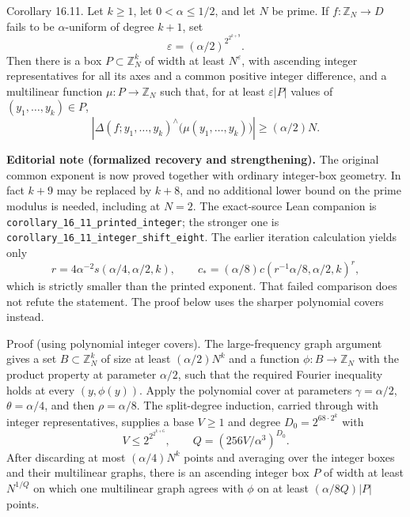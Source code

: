 \documentclass[10pt]{article}
\begin{document}
Corollary 16.11. Let $k\geqslant1$, let $0<\alpha\leqslant1/2$, and let $N$ be prime. If $f: \mathbb{Z}_{N} \rightarrow D$ fails to be $\alpha$-uniform of degree $k+1$, set
\[
\varepsilon=(\alpha/2)^{2^{2^{k+9}}}.
\]
Then there is a box $P\subset\mathbb{Z}_{N}^{k}$ of width at least $N^{\varepsilon}$, with ascending integer representatives for all its axes and a common positive integer difference, and a multilinear function $\mu:P\rightarrow\mathbb{Z}_{N}$ such that, for at least $\varepsilon|P|$ values of $(y_1,\ldots,y_k)\in P$,
\[
\left|\Delta(f;y_1,\ldots,y_k)^{\wedge}\bigl(\mu(y_1,\ldots,y_k)\bigr)\right|
\geqslant (\alpha/2)N.
\]

\noindent\textbf{Editorial note (formalized recovery and strengthening).}
The original common exponent is now proved together with ordinary integer-box geometry. In fact $k+9$ may be replaced by $k+8$, and no additional lower bound on the prime modulus is needed, including at $N=2$. The exact-source Lean companion is \texttt{corollary\_16\_11\_printed\_integer}; the stronger one is \texttt{corollary\_16\_11\_integer\_shift\_eight}. The earlier iteration calculation yields only
\[
r=4\alpha^{-2}s(\alpha/4,\alpha/2,k),\qquad
c_*=(\alpha/8)c(r^{-1}\alpha/8,\alpha/2,k)^r,
\]
which is strictly smaller than the printed exponent. That failed comparison does not refute the statement. The proof below uses the sharper polynomial covers instead.

Proof (using polynomial integer covers). The large-frequency graph argument gives a set $B\subset\mathbb{Z}_N^k$ of size at least $(\alpha/2)N^k$ and a function $\phi:B\rightarrow\mathbb{Z}_N$ with the product property at parameter $\alpha/2$, such that the required Fourier inequality holds at every $(y,\phi(y))$. Apply the polynomial cover at parameters $\gamma=\alpha/2$, $\theta=\alpha/4$, and then $\rho=\alpha/8$. The split-degree induction, carried through with integer representatives, supplies a base $V\geqslant1$ and degree $D_0=2^{68\cdot2^k}$ with
\[
V\leqslant 2^{2^{2^{k+6}}},\qquad
Q=(256V/\alpha^3)^{D_0}.
\]
After discarding at most $(\alpha/4)N^k$ points and averaging over the integer boxes and their multilinear graphs, there is an ascending integer box $P$ of width at least $N^{1/Q}$ on which one multilinear graph agrees with $\phi$ on at least $(\alpha/8Q)|P|$ points.
\end{document}
